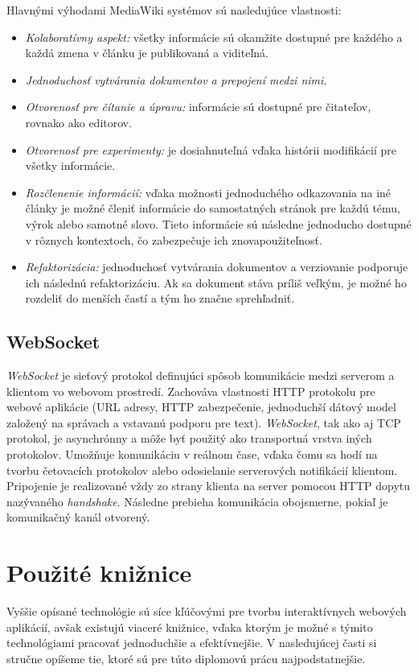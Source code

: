 Hlavnými výhodami MediaWiki systémov sú nasledujúce vlastnosti:
\begin{itemize}
	\item \textit{Kolaboratívny aspekt:} všetky informácie sú okamžite dostupné pre každého a každá zmena v článku je publikovaná a viditeľná.
	\item \textit{Jednoduchosť vytvárania dokumentov a prepojení medzi nimi.}
	\item \textit{Otvorenosť pre čítanie a úpravu:} informácie sú dostupné pre čitateľov, rovnako ako editorov.
	\item \textit{Otvorenosť pre experimenty:} je dosiahnuteľná vďaka histórii modifikácií pre všetky informácie.
	\item \textit{Rozčlenenie informácií:} vďaka možnosti jednoduchého odkazovania na iné články je možné členiť informácie do samostatných stránok pre každú tému, výrok alebo samotné slovo. Tieto informácie sú následne jednoducho dostupné v rôznych kontextoch, čo zabezpečuje ich znovapoužiteľnosť.
	\item \textit{Refaktorizácia:} jednoduchosť vytvárania dokumentov a verziovanie podporuje ich následnú refaktorizáciu. Ak sa dokument stáva príliš veľkým, je možné ho rozdeliť do menších častí a tým ho značne sprehľadniť.
\end{itemize}

\subsection{WebSocket}
\textit{WebSocket} je sieťový protokol definujúci spôsob komunikácie medzi serverom a klientom vo webovom prostredí. Zachováva vlastnosti HTTP protokolu pre webové aplikácie (URL adresy, HTTP zabezpečenie, jednoduchší dátový model založený na správach a vstavanú podporu pre text). \textit{WebSocket}, tak ako aj TCP protokol, je asynchrónny a môže byť použitý ako transportná vrstva iných protokolov. Umožňuje komunikáciu v reálnom čase, vďaka čomu sa hodí na tvorbu četovacích protokolov alebo odosielanie serverových notifikácií klientom. Pripojenie je realizované vždy zo strany klienta na server pomocou HTTP dopytu nazývaného \textit{handshake}\cite{Wang2013}. Následne prebieha komunikácia obojsmerne, pokiaľ je komunikačný kanál otvorený.

\section{Použité knižnice}
Vyššie opísané technológie sú síce kľúčovými pre tvorbu interaktívnych webových aplikácií, avšak existujú viaceré knižnice, vďaka ktorým je možné s týmito technológiami pracovať jednoduchšie a efektívnejšie. V nasledujúcej časti si stručne opíšeme tie, ktoré sú pre túto diplomovú prácu najpodstatnejšie.

